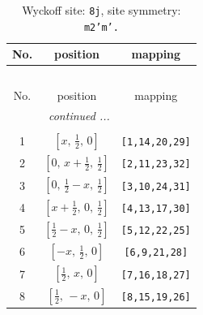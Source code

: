 \documentclass[fleqn,8pt]{jsarticle}
\begin{document}
\begin{longtable}{ccc}
\caption{Wyckoff site: {\tt 8j}, site symmetry: {\tt m2'm'.}}
 \\
 \hline \hline
No. & position & mapping \\ \hline \endfirsthead

\multicolumn{2}{l}{\tablename\ \thetable{}} \\
 \hline \hline
No. & position & mapping \\ \hline \endhead

 \hline \hline
\multicolumn{2}{r}{\footnotesize\it continued ...} \\ \endfoot

 \hline \hline
\multicolumn{2}{r}{} \\ \endlastfoot

1 & $\left[ x,\, \frac{1}{2},\, 0 \right]$ & {\tt [1,14,20,29]} \\ \hline
2 & $\left[ 0,\, x + \frac{1}{2},\, \frac{1}{2} \right]$ & {\tt [2,11,23,32]} \\ \hline
3 & $\left[ 0,\, \frac{1}{2} - x,\, \frac{1}{2} \right]$ & {\tt [3,10,24,31]} \\ \hline
4 & $\left[ x + \frac{1}{2},\, 0,\, \frac{1}{2} \right]$ & {\tt [4,13,17,30]} \\ \hline
5 & $\left[ \frac{1}{2} - x,\, 0,\, \frac{1}{2} \right]$ & {\tt [5,12,22,25]} \\ \hline
6 & $\left[ - x,\, \frac{1}{2},\, 0 \right]$ & {\tt [6,9,21,28]} \\ \hline
7 & $\left[ \frac{1}{2},\, x,\, 0 \right]$ & {\tt [7,16,18,27]} \\ \hline
8 & $\left[ \frac{1}{2},\, - x,\, 0 \right]$ & {\tt [8,15,19,26]} \\
\end{longtable}
\renewcommand{\arraystretch}{1.2}
\end{document}
